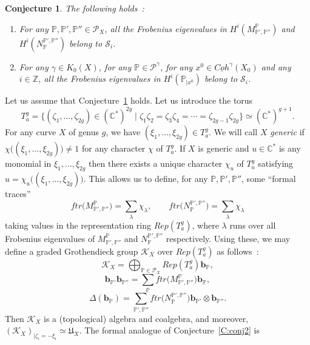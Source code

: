 \documentclass[a4paper,10pt]{amsart}
\def\Z{\mathbb{Z}}
\def\C{\mathbb{C}}
\newtheorem{conj}[theo]{Conjecture}
\numberwithin{equation}{section}
\begin{document}
\vspace{.1in}

\begin{conj}\label{C:conj3} The following holds~:
\begin{enumerate}
\item[i)] For any $\mathbb{P},\mathbb{P}', \mathbb{P}'' \in \mathcal{P}_X$, all the Frobenius eigenvalues in $H^i(M_{\mathbb{P}', \mathbb{P}''}^{\mathbb{P}})$ and $H^i(N_{\mathbb{P}}^{\mathbb{P}',\mathbb{P}''})$ belong to $\mathcal{S}_i$.
\item[ii)] For any $\gamma \in K_0(X)$, for any $\mathbb{P} \in \mathcal{P}^{\gamma}$, for any $x^0 \in \underline{Coh}^\gamma(X_0)$ and any $i \in \Z$, all the Frobenius eigenvalues in $H^i(\mathbb{P}_{|x^0})$ belong to $\mathcal{S}_i$.
\end{enumerate}
\end{conj}

\vspace{.1in}

Let us assume that Conjecture~\ref{C:conj3} holds.  Let us introduce the torus
$$T^g_{a}=\{(\zeta_1, \ldots, \zeta_{2g}) \in (\C^*)^{2g}\;|\; \zeta_1\zeta_2=\zeta_{3}\zeta_4=\cdots=\zeta_{2g-1}\zeta_{2g}\} \simeq (\C^*)^{g+1}.$$
For any curve $X$ of genus $g$, we have $(\xi_1, \ldots, \xi_{2g}) \in T^g_a$.
We will call $X$ \textit{generic} if $\chi\big((\xi_1,\ldots, \xi_{2g})\big) \neq 1$ for any character $\chi$ of $T^g_a$. If $X$ is generic and $u \in \C^*$ is any monomial in $\xi_1, \ldots, \xi_{2g}$ then there exists a unique character $\chi_u$ of $T^g_a$ satisfying $u=\chi_u\big( ( \xi_1, \ldots, \xi_{2g})\big)$. This allows us to define, for any $\mathbb{P}, \mathbb{P}',\mathbb{P}''$, some ``formal traces'' 
$$ftr\big( M_{\mathbb{P}', \mathbb{P}''}^{\mathbb{P}}\big)=\sum_{\lambda} \chi_{\lambda}, \qquad ftr\big(N_{\mathbb{P}}^{\mathbb{P}',\mathbb{P}''}\big)=\sum_{\lambda} \chi_{\lambda}$$
taking values in the representation ring $Rep(T^g_a)$, where $\lambda$ runs over all Frobenius eigenvalues of $M_{\mathbb{P}', \mathbb{P}''}^{\mathbb{P}}$ and $N_{\mathbb{P}}^{\mathbb{P}',\mathbb{P}''}$ respectively.
Using these, we may define a graded Grothendieck group $\mathcal{K}_X$ over $Rep(T^g_{a})$ as follows~:
$$\mathcal{K}_X=\bigoplus_{\mathbb{P} \in \mathcal{P}_X} Rep(T^g_{a}) \mathbf{b}_{\mathbb{P}},$$
$$\mathbf{b}_{\mathbb{P}'} \mathbf{b}_{\mathbb{P}''} =\sum_{\mathbb{P}} ftr\big( M_{\mathbb{P}', \mathbb{P}''}^{\mathbb{P}}\big) \mathbf{b}_{\mathbb{P}},$$
$$\Delta(\mathbf{b}_{\mathbb{P}})=\sum_{\mathbb{P}',\mathbb{P}''} ftr\big(N_{\mathbb{P}}^{\mathbb{P}',\mathbb{P}''}\big)\mathbf{b}_{\mathbb{P}'}\otimes \mathbf{b}_{\mathbb{P}''}.$$
Then $\mathcal{K}_X$ is a (topological) algebra and coalgebra, and moreover, $(\mathcal{K}_X)_{|\zeta_i =-\xi_i} \simeq \mathfrak{U}_X$. The formal analogue of Conjecture~\ref{C:conj2} is
\end{document}
